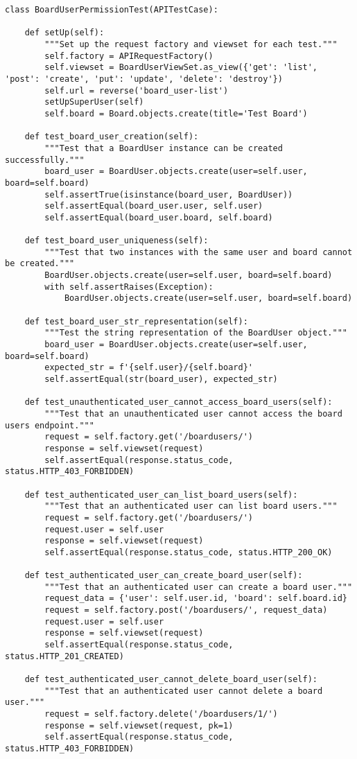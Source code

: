 \begin{lstlisting}[caption={Test Unitario Backend}, label={cod:python}, captionpos=b]
class BoardUserPermissionTest(APITestCase):

    def setUp(self):
        """Set up the request factory and viewset for each test."""
        self.factory = APIRequestFactory()
        self.viewset = BoardUserViewSet.as_view({'get': 'list', 'post': 'create', 'put': 'update', 'delete': 'destroy'})
        self.url = reverse('board_user-list')
        setUpSuperUser(self)
        self.board = Board.objects.create(title='Test Board')

    def test_board_user_creation(self):
        """Test that a BoardUser instance can be created successfully."""
        board_user = BoardUser.objects.create(user=self.user, board=self.board)
        self.assertTrue(isinstance(board_user, BoardUser))
        self.assertEqual(board_user.user, self.user)
        self.assertEqual(board_user.board, self.board)

    def test_board_user_uniqueness(self):
        """Test that two instances with the same user and board cannot be created."""
        BoardUser.objects.create(user=self.user, board=self.board)
        with self.assertRaises(Exception):
            BoardUser.objects.create(user=self.user, board=self.board)

    def test_board_user_str_representation(self):
        """Test the string representation of the BoardUser object."""
        board_user = BoardUser.objects.create(user=self.user, board=self.board)
        expected_str = f'{self.user}/{self.board}'
        self.assertEqual(str(board_user), expected_str)

    def test_unauthenticated_user_cannot_access_board_users(self):
        """Test that an unauthenticated user cannot access the board users endpoint."""
        request = self.factory.get('/boardusers/')
        response = self.viewset(request)
        self.assertEqual(response.status_code, status.HTTP_403_FORBIDDEN)

    def test_authenticated_user_can_list_board_users(self):
        """Test that an authenticated user can list board users."""
        request = self.factory.get('/boardusers/')
        request.user = self.user
        response = self.viewset(request)
        self.assertEqual(response.status_code, status.HTTP_200_OK)

    def test_authenticated_user_can_create_board_user(self):
        """Test that an authenticated user can create a board user."""
        request_data = {'user': self.user.id, 'board': self.board.id}
        request = self.factory.post('/boardusers/', request_data)
        request.user = self.user
        response = self.viewset(request)
        self.assertEqual(response.status_code, status.HTTP_201_CREATED)

    def test_authenticated_user_cannot_delete_board_user(self):
        """Test that an authenticated user cannot delete a board user."""
        request = self.factory.delete('/boardusers/1/')
        response = self.viewset(request, pk=1)
        self.assertEqual(response.status_code, status.HTTP_403_FORBIDDEN)
\end{lstlisting}


